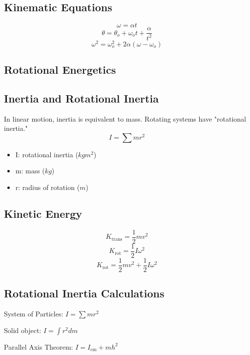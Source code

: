 \subsection{Kinematic Equations}
\[\omega=\alpha t\]
\[\theta=\theta_o+\omega_ot+\frac{\alpha}{t^2}\]
\[\omega^2=\omega^2_o+2\alpha(\omega-\omega_o)\]

\subsection{Rotational Energetics}


\subsection{Inertia and Rotational Inertia}
In linear motion, inertia is equivalent to mass. Rotating systems have "rotational inertia."
\[I=\sum mr^2\]
\begin{itemize}
	\item I: rotational inertia ($kg m^2$)
	\item m: mass ($kg$)
	\item r: radius of rotation ($m$)
\end{itemize}

\subsection{Kinetic Energy}
\[K_{\text{trans}}=\frac{1}{2}mv^2\]
\[K_{\text{rot}}=\frac{1}{2}I\omega^2\]
\[K_{\text{rot}}=\frac{1}{2}mv^2+\frac{1}{2}I\omega^2\]

\subsection{Rotational Inertia Calculations}
\begin{center}
		\item System of Particles: $I=\sum mr^2$
		\item Solid object: $I=\int r^2 dm$
		\item Parallel Axis Theorem: $I= I_{\text{cm}}+m h^2$
\end{center}